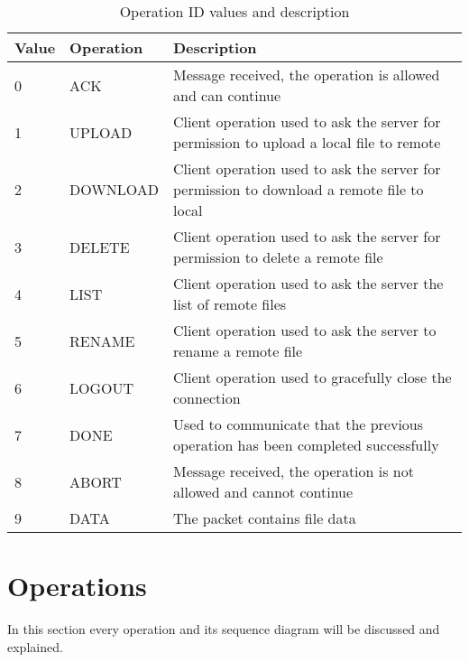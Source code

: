\begin{longtable}{|p{}|p{}|p{}|}
	\caption{Operation ID values and description}
	\label{Operation ID list} 
	\label{tab:operation-ids-list} \\
	\hline
	\textbf{Value} & \textbf{Operation} & \textbf{Description} \\
	\hline
	 0 & ACK & Message received, the operation is allowed and can continue \\
	\hline
	 1 & UPLOAD & Client operation used to ask the server for permission to upload a local file to remote \\
	\hline
	 2 & DOWNLOAD & Client operation used to ask the server for permission to download a remote file to local \\
	\hline
	 3 & DELETE & Client operation used to ask the server for permission to delete a remote file \\
	\hline
	 4 & LIST & Client operation used to ask the server the list of remote files  \\
	\hline
	 5 & RENAME & Client operation used to ask the server to rename a remote file \\
	\hline
	 6 & LOGOUT & Client operation used to gracefully close the connection \\
	\hline
	 7 & DONE & Used to communicate that the previous operation has been completed successfully \\
	\hline
	 8 & ABORT & Message received, the operation is not allowed and cannot continue \\
	\hline
	 9 & DATA & The packet contains file data \\
	\hline
\end{longtable}%

\section{Operations} \label{sec:operations}

In this section every operation and its sequence diagram will be discussed and explained.

